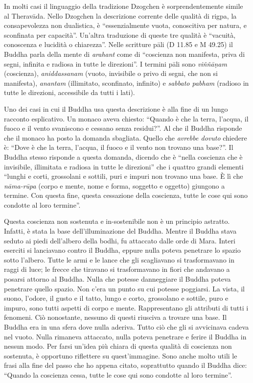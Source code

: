 In molti casi il linguaggio della tradizione Dzogchen è sorprendentemente simile al Theravāda. Nello Dzogchen la descrizione corrente delle qualità di rigpa, la consapevolezza non dualistica, è ``essenzialmente vuota, conoscitiva per natura, e sconfinata per capacità''. Un'altra traduzione di queste tre qualità è ``vacuità, conoscenza e lucidità o chiarezza''. Nelle scritture pāli (D 11.85 e M 49.25) il Buddha parla della mente di \textit{arahant} come di ``coscienza non manifesta, priva di segni, infinita e radiosa in tutte le direzioni''. I termini pāli sono \textit{viññāṇam} (coscienza), \textit{aniddassanam }(vuoto, invisibile o privo di segni, che non si manifesta), \textit{anantam }(illimitato, sconfinato, infinito) e \textit{sabbato pabham} (radioso in tutte le direzioni, accessibile da tutti i lati).

Uno dei casi in cui il Buddha usa questa descrizione è alla fine di un lungo racconto esplicativo. Un monaco aveva chiesto: ``Quando è che la terra, l'acqua, il fuoco e il vento svaniscono e cessano senza residui?''. Al che il Buddha risponde che il monaco ha posto la domanda sbagliata. Quello che \textit{avrebbe dovuto} chiedere è: ``Dove è che la terra, l'acqua, il fuoco e il vento non trovano una base?''. Il Buddha stesso risponde a questa domanda, dicendo che è ``nella coscienza che è invisibile, illimitata e radiosa in tutte le direzioni'' che i quattro grandi elementi ``lunghi e corti, grossolani e sottili, puri e impuri non trovano una base. È lì che \textit{nāma-rūpa} (corpo e mente, nome e forma, soggetto e oggetto) giungono a termine. Con questa fine, questa cessazione della coscienza, tutte le cose qui sono condotte al loro termine''. 

Questa coscienza non sostenuta e in-sostenibile non è un principio astratto. Infatti, è stata la base dell'illuminazione del Buddha. Mentre il Buddha stava seduto ai piedi dell'albero della bodhi, fu attaccato dalle orde di Mara. Interi eserciti si lanciavano contro il Buddha, eppure nulla poteva penetrare lo spazio sotto l'albero. Tutte le armi e le lance che gli scagliavano si trasformavano in raggi di luce; le frecce che tiravano si trasformavano in fiori che andavano a posarsi attorno al Buddha. Nulla che potesse danneggiare il Buddha poteva penetrare quello spazio. Non c'era un punto su cui potesse poggiarsi. La vista, il suono, l'odore, il gusto e il tatto, lungo e corto, grossolano e sottile, puro e impuro, sono tutti aspetti di corpo e mente. Rappresentano gli attributi di tutti i fenomeni. Ciò nonostante, nessuno di questi riusciva a trovare una base. Il Buddha era in una sfera dove nulla aderiva. Tutto ciò che gli si avvicinava cadeva nel vuoto. Nulla rimaneva attaccato, nulla poteva penetrare e ferire il Buddha in nessun modo. Per farsi un'idea più chiara di questa qualità di coscienza non sostenuta, è opportuno riflettere su quest'immagine. Sono anche molto utili le frasi alla fine del passo che ho appena citato, soprattutto quando il Buddha dice: ``Quando la coscienza cessa, tutte le cose qui sono condotte al loro termine''. 

